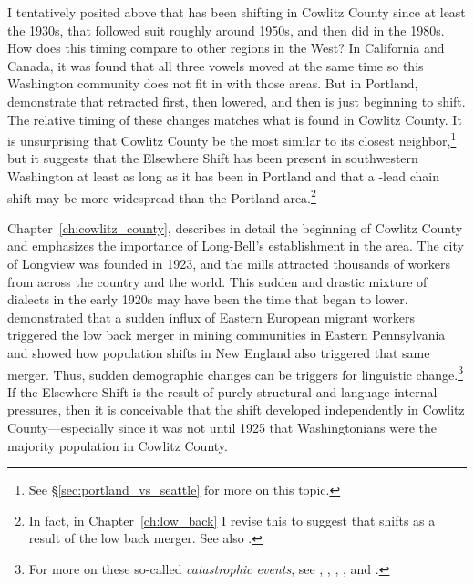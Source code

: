 I tentatively posited above that \bat has been shifting in Cowlitz County since at least the 1930s, that \bet followed suit roughly around 1950s, and then \bit did in the 1980s. How does this timing compare to other regions in the West? In California and Canada, it was found that all three vowels moved at the same time \citep{pratt_etal_2018, donofrio_etal_2019, lawrance_2002_thesis, boberg_2005} so this Washington community does not fit in with those areas. But in Portland, \citet{becker_etal_2016_pads} demonstrate that \bat retracted first, then \bet lowered, and then \bit is just beginning to shift. The relative timing of these changes matches what is found in Cowlitz County. It is unsurprising that Cowlitz County be the most similar to its closest neighbor,\footnote{See \S\ref{sec:portland_vs_seattle} for more on this topic.} but it suggests that the Elsewhere Shift has been present in southwestern Washington at least as long as it has been in Portland and that a \bat-lead chain shift may be more widespread than the Portland area.\footnote{In fact, in Chapter~\ref{ch:low_back} I revise this to suggest that \bat shifts as a result of the low back merger. See also \citet{becker_2019_pads}.}

Chapter~\ref{ch:cowlitz_county}, describes in detail the beginning of Cowlitz County and emphasizes the importance of Long-Bell's establishment in the area. The city of Longview was founded in 1923, and the mills attracted thousands of workers from across the country and the world. This sudden and drastic mixture of dialects in the early 1920s may have been the time that \bat began to lower. \citet{herold_1990_diss} demonstrated that a sudden influx of Eastern European migrant workers triggered the low back merger in mining communities in Eastern Pennsylvania and \citet{johnson_2010_pads} showed how population shifts in New England also triggered that same merger. Thus, sudden demographic changes can be triggers for linguistic change.\footnote{For more on these so-called \textit{catastrophic events}, see \citet{bailey_etal_1996}, \citet{bailey_2018}, \citet{schilling_2017}, \citet{carmichael_2017}, and \citet[24]{labov_1994}.} If the Elsewhere Shift is the result of purely structural and language-internal pressures, then it is conceivable that the shift developed independently in Cowlitz County---especially since it was not until 1925 that Washingtonians were the majority population in Cowlitz County.

